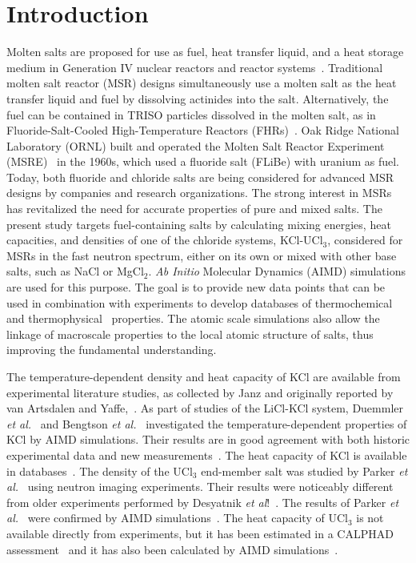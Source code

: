 \documentclass[preprint,3p,10pt,number,sort&compress]{elsarticle}
\begin{document}

\section{Introduction}
\label{sec:intro}
Molten salts are proposed for use as fuel, heat transfer liquid, and a heat storage medium in Generation IV nuclear reactors and reactor systems~\cite{SERP2014308}. Traditional molten salt reactor (MSR) designs simultaneously use a molten salt as the heat transfer liquid and fuel by dissolving actinides into the salt. Alternatively, the fuel can be contained in TRISO particles dissolved in the molten salt, as in Fluoride-Salt-Cooled High-Temperature Reactors (FHRs)~\cite{jiang2022}. Oak Ridge National Laboratory (ORNL) built and operated the Molten Salt Reactor Experiment (MSRE)~\cite{MSRE1,MSRE2} in the 1960s, which used a fluoride salt (FLiBe) with uranium as fuel. Today, both fluoride and chloride salts are being considered for advanced MSR designs by companies and research organizations. The strong interest in MSRs has revitalized the need for accurate properties of pure and mixed salts. The present study targets fuel-containing salts by calculating mixing energies, heat capacities, and densities of one of the chloride systems, KCl-UCl$_3$, considered for MSRs in the fast neutron spectrum, either on its own or mixed with other base salts, such as NaCl or MgCl$_2$. \textit{Ab Initio} Molecular Dynamics (AIMD) simulations are used for this purpose. The goal is to provide new data points that can be used in combination with experiments to develop databases of thermochemical~\cite{ARD2022153631} and thermophysical~\cite{BIRRI2022117954} properties. The atomic scale simulations also allow the linkage of macroscale properties to the local atomic structure of salts, thus improving the fundamental understanding.   

The temperature-dependent density and heat capacity of KCl are available from experimental literature studies, as collected by Janz \cite{Janz1988} and originally reported by van Artsdalen and Yaffe,~\cite{Artsdalen1955}.  As part of studies of the LiCl-KCl system, Duemmler \textit{et al.}~\cite{DUEMMLER2022153414} and Bengtson \textit{et al.}~\cite{BENGTSON2014362} investigated the temperature-dependent properties of KCl by AIMD simulations. Their results are in good agreement with both historic experimental data and new measurements~\cite{Artsdalen1955,DUEMMLER2022153414}. The heat capacity of KCl is available in databases~\cite{NIST,219851}. The density of the UCl$_3$ end-member salt was studied by Parker \textit{et al.}~\cite{Parker} using neutron imaging experiments. Their results were noticeably different from older experiments performed by Desyatnik \textit{et al}!~\cite{Desyatnik2}. The results of Parker \textit{et al.}~\cite{Parker} were confirmed by AIMD simulations~\cite{Andersson}. The heat capacity of UCl$_3$ is not available directly from experiments, but it has been estimated in a CALPHAD assessment~\cite{YIN2020,BENES2008} and it has also been calculated by AIMD simulations~\cite{Andersson}.
 
\end{document}
